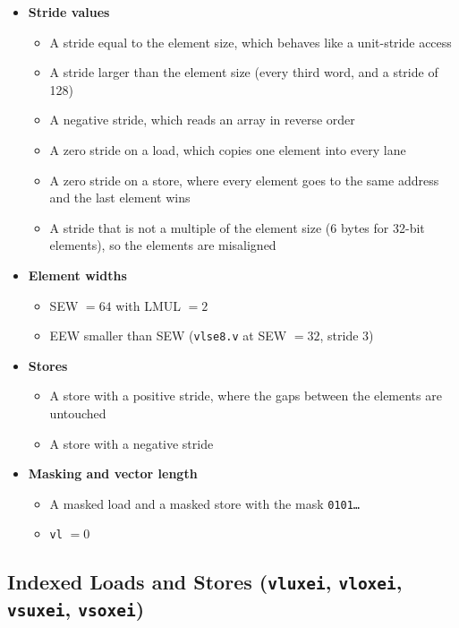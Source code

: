 \documentclass[11pt,a4paper]{article}
\begin{document}
\begin{itemize}
    \item \textbf{Stride values}
    \begin{itemize}
        \item A stride equal to the element size, which behaves like a unit-stride access
        \item A stride larger than the element size (every third word, and a stride of 128)
        \item A negative stride, which reads an array in reverse order
        \item A zero stride on a load, which copies one element into every lane
        \item A zero stride on a store, where every element goes to the same address and the
              last element wins
        \item A stride that is not a multiple of the element size (6 bytes for 32-bit
              elements), so the elements are misaligned
    \end{itemize}

    \item \textbf{Element widths}
    \begin{itemize}
        \item SEW $= 64$ with LMUL $= 2$
        \item EEW smaller than SEW (\texttt{vlse8.v} at SEW $= 32$, stride 3)
    \end{itemize}

    \item \textbf{Stores}
    \begin{itemize}
        \item A store with a positive stride, where the gaps between the elements are untouched
        \item A store with a negative stride
    \end{itemize}

    \item \textbf{Masking and vector length}
    \begin{itemize}
        \item A masked load and a masked store with the mask \texttt{0101\ldots}
        \item \texttt{vl} $= 0$
    \end{itemize}
\end{itemize}

\subsection*{Indexed Loads and Stores (\texttt{vluxei}, \texttt{vloxei}, \texttt{vsuxei},
\texttt{vsoxei})}
\label{subsec:ldst-indexed}
\end{document}
